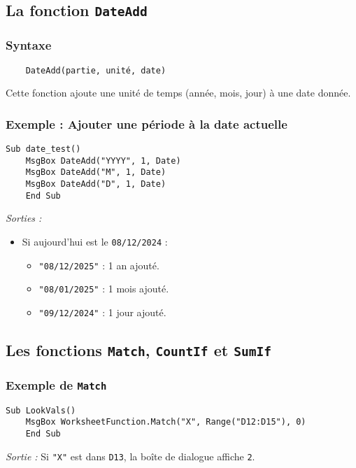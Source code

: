 \documentclass[a4paper,12pt]{report}
\begin{document}
\subsection{La fonction \texttt{DateAdd}}

\subsubsection{Syntaxe}
\begin{verbatim}
	DateAdd(partie, unité, date)
\end{verbatim}

Cette fonction ajoute une unité de temps (année, mois, jour) à une date donnée.

\subsubsection{Exemple : Ajouter une période à la date actuelle}
\begin{lstlisting}[language=VBScript]
	Sub date_test()
	MsgBox DateAdd("YYYY", 1, Date)
	MsgBox DateAdd("M", 1, Date)
	MsgBox DateAdd("D", 1, Date)
	End Sub
\end{lstlisting}

\emph{Sorties :}
\begin{itemize}
	\item Si aujourd'hui est le \texttt{08/12/2024} :
	\begin{itemize}
		\item \texttt{"08/12/2025"} : 1 an ajouté.
		\item \texttt{"08/01/2025"} : 1 mois ajouté.
		\item \texttt{"09/12/2024"} : 1 jour ajouté.
	\end{itemize}
\end{itemize}

\subsection{Les fonctions \texttt{Match}, \texttt{CountIf} et \texttt{SumIf}}
\newpage
\subsubsection{Exemple de \texttt{Match}}
\begin{lstlisting}[language=VBScript]
	Sub LookVals()
	MsgBox WorksheetFunction.Match("X", Range("D12:D15"), 0)
	End Sub
\end{lstlisting}

\emph{Sortie :} Si \texttt{"X"} est dans \texttt{D13}, la boîte de dialogue affiche \texttt{2}.
\end{document}
